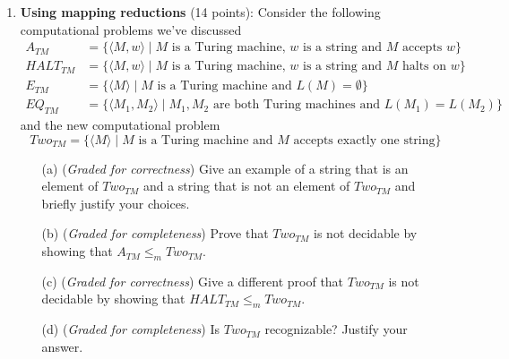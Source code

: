 \documentclass[12pt, oneside]{article}
\newcommand{\gradeCorrect}{({\it Graded for correctness}) }
\newcommand{\gradeComplete}{({\it Graded for completeness}) }
\begin{document}
\begin{enumerate}[wide, labelwidth=!, labelindent=0pt]
\begin{enumerate}
\item\gradeCorrect $\emptyset \le_m \{w w \mid w \in \{0,1\}^* \}$ and
$f(x) = 1$ for each $x \in \{0,1\}^*$.


\end{enumerate}

\item\textbf{Using mapping reductions} (14 points):
Consider the following computational problems we've discussed
\begin{align*}
A_{TM} &= \{ \langle M, w \rangle \mid M \text{ is a Turing machine, } w \text{ is a string and $M$ accepts $w$}\} \\
HALT_{TM} &= \{ \langle M, w \rangle \mid M \text{ is a Turing machine, } w \text{ is a string and $M$ halts on $w$}\} \\
E_{TM} &=  \{ \langle M \rangle \mid M \text{ is a Turing machine and } L(M) = \emptyset\} \\
EQ_{TM} &= \{ \langle M_1, M_2 \rangle \mid M_1, M_2 \text{ are both Turing machines and } L(M_1) = L(M_2) \}
\end{align*}
and the new computational problem
\[
    Two_{TM} = \{ \langle M \rangle \mid M \text{ is a Turing machine and $M$ accepts exactly one string} \}
\]

\begin{enumerate}
\item[(a)] \gradeCorrect Give an example of a string that is an element of $Two_{TM}$ and a string that is not an element of
$Two_{TM}$ and briefly justify your choices.
\item[(b)] \gradeComplete Prove that $Two_{TM}$ is not decidable by showing that $A_{TM} \leq_m Two_{TM}$.
\item[(c)] \gradeCorrect Give a different proof that $Two_{TM}$ is not decidable by showing that $HALT_{TM} \leq_m Two_{TM}$.
\item[(d)] \gradeComplete Is $Two_{TM}$ recognizable? Justify your answer.
\end{enumerate}


\end{enumerate}
\end{document}
